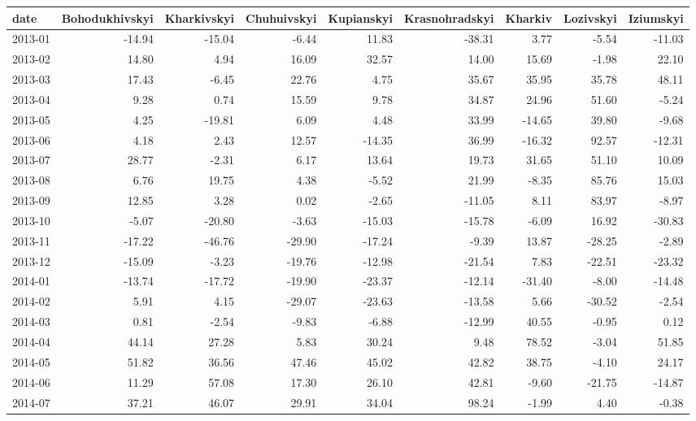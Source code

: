 \begin{table}[ht]
\centering
\begin{tabular}{lrrrrrrrr}
  \hline
date & Bohodukhivskyi & Kharkivskyi & Chuhuivskyi & Kupianskyi & Krasnohradskyi & Kharkiv & Lozivskyi & Iziumskyi \\ 
  \hline
2013-01 & -14.94 & -15.04 & -6.44 & 11.83 & -38.31 & 3.77 & -5.54 & -11.03 \\ 
  2013-02 & 14.80 & 4.94 & 16.09 & 32.57 & 14.00 & 15.69 & -1.98 & 22.10 \\ 
  2013-03 & 17.43 & -6.45 & 22.76 & 4.75 & 35.67 & 35.95 & 35.78 & 48.11 \\ 
  2013-04 & 9.28 & 0.74 & 15.59 & 9.78 & 34.87 & 24.96 & 51.60 & -5.24 \\ 
  2013-05 & 4.25 & -19.81 & 6.09 & 4.48 & 33.99 & -14.65 & 39.80 & -9.68 \\ 
  2013-06 & 4.18 & 2.43 & 12.57 & -14.35 & 36.99 & -16.32 & 92.57 & -12.31 \\ 
  2013-07 & 28.77 & -2.31 & 6.17 & 13.64 & 19.73 & 31.65 & 51.10 & 10.09 \\ 
  2013-08 & 6.76 & 19.75 & 4.38 & -5.52 & 21.99 & -8.35 & 85.76 & 15.03 \\ 
  2013-09 & 12.85 & 3.28 & 0.02 & -2.65 & -11.05 & 8.11 & 83.97 & -8.97 \\ 
  2013-10 & -5.07 & -20.80 & -3.63 & -15.03 & -15.78 & -6.09 & 16.92 & -30.83 \\ 
  2013-11 & -17.22 & -46.76 & -29.90 & -17.24 & -9.39 & 13.87 & -28.25 & -2.89 \\ 
  2013-12 & -15.09 & -3.23 & -19.76 & -12.98 & -21.54 & 7.83 & -22.51 & -23.32 \\ 
  2014-01 & -13.74 & -17.72 & -19.90 & -23.37 & -12.14 & -31.40 & -8.00 & -14.48 \\ 
  2014-02 & 5.91 & 4.15 & -29.07 & -23.63 & -13.58 & 5.66 & -30.52 & -2.54 \\ 
  2014-03 & 0.81 & -2.54 & -9.83 & -6.88 & -12.99 & 40.55 & -0.95 & 0.12 \\ 
  2014-04 & 44.14 & 27.28 & 5.83 & 30.24 & 9.48 & 78.52 & -3.04 & 51.85 \\ 
  2014-05 & 51.82 & 36.56 & 47.46 & 45.02 & 42.82 & 38.75 & -4.10 & 24.17 \\ 
  2014-06 & 11.29 & 57.08 & 17.30 & 26.10 & 42.81 & -9.60 & -21.75 & -14.87 \\ 
  2014-07 & 37.21 & 46.07 & 29.91 & 34.04 & 98.24 & -1.99 & 4.40 & -0.38 \\ 

\end{tabular}
\end{table}
